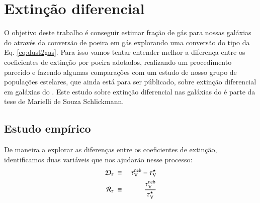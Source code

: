 



\chapter{Extinção diferencial}
\label{sec:difextin}

O objetivo deste trabalho é conseguir estimar fração de gás para nossas galáxias do \CAL através da
conversão de poeira em gás explorando uma conversão do tipo da Eq. \ref{eq:dust2gas}. Para isso
vamos tentar entender melhor a diferença entre os coeficientes de extinção por poeira adotados,
realizando um procedimento parecido e fazendo algumas comparações com um estudo de nosso grupo de
populações estelares, que ainda está para ser públicado, sobre extinção diferencial em galáxias do
\SDSS. Este estudo sobre extinção diferencial nas galáxias do \SDSS é parte da tese de Marielli de
Souza Schlickmann.

\section{Estudo empírico}
\label{sec:difextin:emp}

De maneira a explorar as diferenças entre os coeficientes de extinção, identificamos duas variáveis
que nos ajudarão nesse processo:
\begin{eqnarray}
	\mathcal{D}_\tau\ &\equiv&\ \tau_{\mathrm{V}}^{\mathrm{neb}} - \tau_{\mathrm{V}}^\star \\
	\label{eq:difftau}
	\mathcal{R}_\tau\ &\equiv&\ \frac{\tau_{\mathrm{V}}^{\mathrm{neb}}}{\tau_{\mathrm{V}}^\star} 
	\label{eq:ratiotau}
\end{eqnarray}

